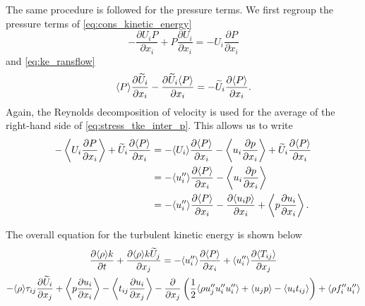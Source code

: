 \documentclass[oneside,a4paper,11pt]{report}
\begin{document}
The same procedure is followed for the pressure terms. We first regroup the pressure terms of \cref{eq:cons_kinetic_energy}
\begin{equation}
\label{eq:stress_tke_inter_p}
      -\frac{\partial U_i P }{\partial x_i} + P \frac{\partial U_i}{\partial x_i} =  -U_i \frac{\partial P }{\partial x_i}   
\end{equation}
and \cref{eq:ke_ransflow}
\begin{equation}
     \langle P \rangle \frac{ \partial \widetilde{U}_i}{\partial x_i} - \frac{ \partial \widetilde{U}_i \langle P \rangle }{\partial x_i} = -\widetilde{U}_i \frac{ \partial \langle P \rangle}{\partial x_i}.    
\end{equation}
Again, the Reynolds decomposition of velocity is used for the average of the right-hand side of \cref{eq:stress_tke_inter_p}. This allows us to write
\begin{align}
-\left < U_i \frac{\partial P }{\partial x_i} \right > + \widetilde{U}_i \frac{ \partial \langle P \rangle}{\partial x_i} & = -\langle U_i \rangle \frac{\partial \langle P \rangle}{\partial x_i} - \left < u_i \frac{\partial p}{\partial x_i} \right > + \widetilde{U}_i \frac{\partial \langle P \rangle}{\partial x_i} \nonumber \\
& = -\langle u_i'' \rangle \frac{\partial \langle P \rangle}{\partial x_i} - \left < u_i \frac{\partial p}{\partial x_i} \right > \nonumber \\
& = -\langle u_i'' \rangle \frac{\partial \langle P \rangle}{\partial x_i} - \frac{\partial \langle u_i p \rangle}{\partial x_i} + \left < p \frac{\partial u_i}{\partial x_i} \right >.
\end{align} 

The overall equation for the turbulent kinetic energy is shown below
\begin{multline}
\label{eq:ke_favre_conservation}
\frac{ \partial \langle \rho \rangle k }{ \partial t}  + \frac{ \partial \langle \rho \rangle k \widetilde{U}_j }{ \partial x_j } = - \langle u_i'' \rangle \frac{ \partial \langle P \rangle }{ \partial x_i } + \langle u_i'' \rangle \frac{ \partial \langle T_{ij} \rangle }{ \partial x_j } \\
- \langle \rho \rangle \tau_{ij} \frac{ \partial \widetilde{U}_i }{ \partial x_j}  + \left < p \frac{ \partial u_i } { \partial x_i } \right > - \left <  t_{ij} \frac{ \partial u_i }{ \partial x_j } \right > - \frac{\partial}{ \partial x_j} \left ( \frac{1}{2} \langle \rho u_j'' u_i'' u_i'' \rangle + \langle u_j p \rangle  - \langle u_i t_{ij} \rangle \right ) + \langle \rho f_i'' u_i'' \rangle
\end{multline}
\end{document}
